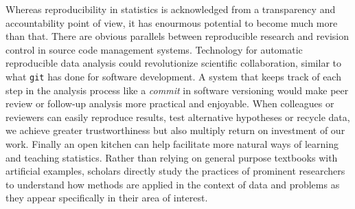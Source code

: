 Whereas reproducibility in statistics is acknowledged from a transparency and accountability point of view, it has enourmous potential to become much more than that. There are obvious parallels between reproducible research and revision control in source code management systems. Technology for automatic reproducible data analysis could revolutionize scientific collaboration, similar to what \texttt{git} has done for software development. A system that keeps track of each step in the  analysis process like a \emph{commit} in software versioning would make peer review or follow-up analysis more practical and enjoyable. 
When colleagues or reviewers can easily reproduce results, test alternative hypotheses or recycle data, we achieve greater trustworthiness but also multiply return on investment of our work. Finally an open kitchen can help facilitate more natural ways of learning and teaching statistics. Rather than relying on general purpose textbooks with artificial examples, scholars directly study the practices of prominent researchers to understand how methods are applied in the context of data and problems as they appear specifically in their area of interest.